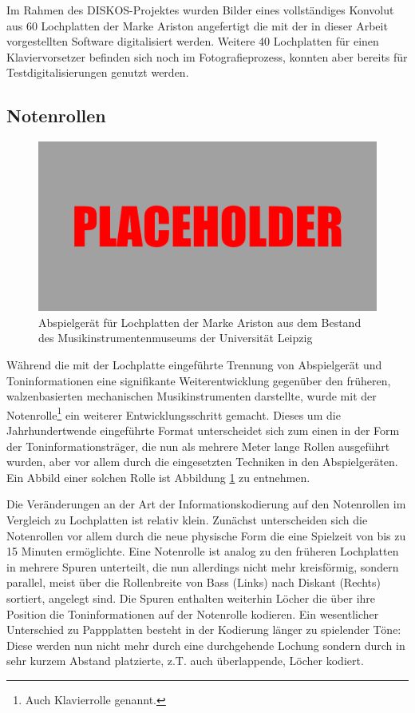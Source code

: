 Im Rahmen des DISKOS-Projektes wurden Bilder eines vollständiges Konvolut aus 60 Lochplatten der Marke Ariston angefertigt die mit der in dieser Arbeit vorgestellten Software digitalisiert werden.
Weitere 40 Lochplatten für einen Klaviervorsetzer befinden sich noch im Fotografieprozess, konnten aber bereits für Testdigitalisierungen genutzt werden.

\subsection{Notenrollen}

\begin{figure}[t]
    \centering
    \includegraphics[width=\textwidth]{graphics/placeholder.png}
    \caption{Abspielgerät für Lochplatten der Marke Ariston aus dem Bestand des Musikinstrumentenmuseums der Universität Leipzig}
    \label{pianoroll}
\end{figure}

Während die mit der Lochplatte eingeführte Trennung von Abspielgerät und Toninformationen eine signifikante Weiterentwicklung gegenüber den früheren, walzenbasierten mechanischen Musikinstrumenten darstellte, wurde mit der Notenrolle\footnote{Auch Klavierrolle genannt.} ein weiterer Entwicklungsschritt gemacht.
Dieses um die Jahrhundertwende eingeführte Format unterscheidet sich zum einen in der Form der Toninformationsträger, die nun als mehrere Meter lange Rollen ausgeführt wurden, aber vor allem durch die eingesetzten Techniken in den Abspielgeräten.
Ein Abbild einer solchen Rolle ist Abbildung \ref{pianoroll} zu entnehmen.

Die Veränderungen an der Art der Informationskodierung auf den Notenrollen im Vergleich zu Lochplatten ist relativ klein.
Zunächst unterscheiden sich die Notenrollen vor allem durch die neue physische Form die eine Spielzeit von bis zu 15 Minuten ermöglichte.
Eine Notenrolle ist analog zu den früheren Lochplatten in mehrere Spuren unterteilt, die nun allerdings nicht mehr kreisförmig, sondern parallel, meist über die Rollenbreite von Bass (Links) nach Diskant (Rechts) sortiert, angelegt sind.
Die Spuren enthalten weiterhin Löcher die über ihre Position die Toninformationen auf der Notenrolle kodieren.
Ein wesentlicher Unterschied zu Pappplatten besteht in der Kodierung länger zu spielender Töne: Diese werden nun nicht mehr durch eine durchgehende Lochung sondern durch in sehr kurzem Abstand platzierte, z.T. auch überlappende, Löcher kodiert.

